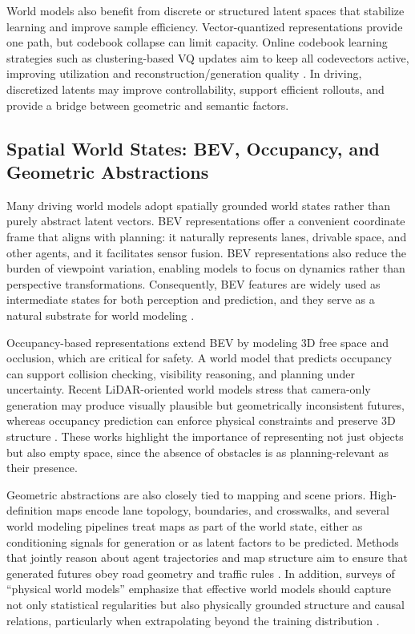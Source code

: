 World models also benefit from discrete or structured latent spaces that stabilize learning and improve sample efficiency. Vector-quantized representations provide one path, but codebook collapse can limit capacity. Online codebook learning strategies such as clustering-based VQ updates aim to keep all codevectors active, improving utilization and reconstruction/generation quality \cite{ZhengVedaldi2023}. In driving, discretized latents may improve controllability, support efficient rollouts, and provide a bridge between geometric and semantic factors.

\subsection{Spatial World States: BEV, Occupancy, and Geometric Abstractions}

Many driving world models adopt spatially grounded world states rather than purely abstract latent vectors. BEV representations offer a convenient coordinate frame that aligns with planning: it naturally represents lanes, drivable space, and other agents, and it facilitates sensor fusion. BEV representations also reduce the burden of viewpoint variation, enabling models to focus on dynamics rather than perspective transformations. Consequently, BEV features are widely used as intermediate states for both perception and prediction, and they serve as a natural substrate for world modeling \cite{Li2022,Li2024}.

Occupancy-based representations extend BEV by modeling 3D free space and occlusion, which are critical for safety. A world model that predicts occupancy can support collision checking, visibility reasoning, and planning under uncertainty. Recent LiDAR-oriented world models stress that camera-only generation may produce visually plausible but geometrically inconsistent futures, whereas occupancy prediction can enforce physical constraints and preserve 3D structure \cite{Bogdoll2025,Li2025}. These works highlight the importance of representing not just objects but also empty space, since the absence of obstacles is as planning-relevant as their presence.

Geometric abstractions are also closely tied to mapping and scene priors. High-definition maps encode lane topology, boundaries, and crosswalks, and several world modeling pipelines treat maps as part of the world state, either as conditioning signals for generation or as latent factors to be predicted. Methods that jointly reason about agent trajectories and map structure aim to ensure that generated futures obey road geometry and traffic rules \cite{Zhao2024,WangDriveDreamer2023}. In addition, surveys of “physical world models” emphasize that effective world models should capture not only statistical regularities but also physically grounded structure and causal relations, particularly when extrapolating beyond the training distribution \cite{Chen2025}.

